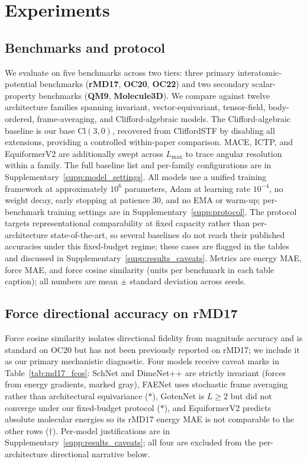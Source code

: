\section{Experiments}\label{sec:experiments}

\subsection{Benchmarks and protocol}\label{sec:benchmarks}

We evaluate on five benchmarks across two tiers: three primary interatomic-potential benchmarks (\textbf{rMD17}, \textbf{OC20}, \textbf{OC22}) and two secondary scalar-property benchmarks (\textbf{QM9}, \textbf{Molecule3D}). We compare against twelve architecture families spanning invariant, vector-equivariant, tensor-field, body-ordered, frame-averaging, and Clifford-algebraic models. The Clifford-algebraic baseline is our base $\mathrm{Cl}(3,0)$, recovered from CliffordSTF by disabling all extensions, providing a controlled within-paper comparison. MACE, ICTP, and EquiformerV2 are additionally swept across $L_{\max}$ to trace angular resolution within a family. The full baseline list and per-family configurations are in Supplementary~\ref{supp:model_settings}. All models use a unified training framework at approximately $10^6$ parameters, Adam at learning rate $10^{-4}$, no weight decay, early stopping at patience 30, and no EMA or warm-up; per-benchmark training settings are in Supplementary~\ref{supp:protocol}. The protocol targets representational comparability at fixed capacity rather than per-architecture state-of-the-art, so several baselines do not reach their published accuracies under this fixed-budget regime; these cases are flagged in the tables and discussed in Supplementary~\ref{supp:results_caveats}. Metrics are energy MAE, force MAE, and force cosine similarity (units per benchmark in each table caption); all numbers are mean $\pm$ standard deviation across seeds.

\subsection{Force directional accuracy on rMD17}\label{sec:results_md17}

Force cosine similarity isolates directional fidelity from magnitude accuracy and is standard on OC20 but has not been previously reported on rMD17; we include it as our primary mechanistic diagnostic. Four models receive caveat marks in Table~\ref{tab:md17_fcos}: SchNet and DimeNet++ are strictly invariant (forces from energy gradients, marked gray), FAENet uses stochastic frame averaging rather than architectural equivariance ($\ast$), GotenNet is $L\!\geq\!2$ but did not converge under our fixed-budget protocol ($\ast$), and EquiformerV2 predicts absolute molecular energies so its rMD17 energy MAE is not comparable to the other rows ($\dagger$). Per-model justifications are in Supplementary~\ref{supp:results_caveats}; all four are excluded from the per-architecture directional narrative below.

